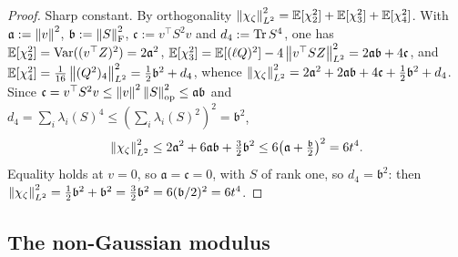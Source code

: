 \begin{proof}
Sharp constant. By orthogonality
$\left\lVert \chi_\zeta\right\rVert_{L^2}^2=\mathbb{E}[\chi_2^2]+\mathbb{E}[\chi_3^2]+\mathbb{E}[\chi_4^2]$. With
$\mathfrak a:=\left\lVert v\right\rVert^2$, $\mathfrak b:=\left\lVert S\right\rVert_{\mathrm{F}}^2$, $\mathfrak c:=v^\top S^2v$ and
$d_4:=\operatorname{Tr} S^4$, one has $\mathbb{E}[\chi_2^2]=\operatorname{Var}((v^\top Z)^2)=2\mathfrak a^2$,
$\mathbb{E}[\chi_3^2]=\mathbb{E}[(\ell Q)^2]-4\left\lVert v^\top SZ\right\rVert_{L^2}^2=2\mathfrak a\mathfrak b+4\mathfrak c$,
and $\mathbb{E}[\chi_4^2]=\tfrac1{16}\left\lVert (Q^2)_4\right\rVert_{L^2}^2=\tfrac12\mathfrak b^2+d_4$, whence
$\left\lVert \chi_\zeta\right\rVert_{L^2}^2=2\mathfrak a^2+2\mathfrak a\mathfrak b+4\mathfrak c+\tfrac12\mathfrak b^2+d_4$.
Since $\mathfrak c=v^\top S^2v\leq\left\lVert v\right\rVert^2\left\lVert S\right\rVert_{\mathrm{op}}^2\leq\mathfrak a\mathfrak b$ and
$d_4=\sum_i\lambda_i(S)^4\leq(\sum_i\lambda_i(S)^2)^2=\mathfrak b^2$,
\[
    \left\lVert \chi_\zeta\right\rVert_{L^2}^2
    \leq2\mathfrak a^2+6\mathfrak a\mathfrak b+\tfrac32\mathfrak b^2
    \leq6\bigl(\mathfrak a+\tfrac{\mathfrak b}2\bigr)^2=6t^4 .
\]
Equality holds at $v=0$, so $\mathfrak a=\mathfrak c=0$, with $S$ of rank one, so
$d_4=\mathfrak b^2$: then
$\left\lVert \chi_\zeta\right\rVert_{L^2}^2=\tfrac12\mathfrak b^2+\mathfrak b^2=\tfrac32\mathfrak b^2=6(\mathfrak b/2)^2=6t^4$.
\end{proof}

\subsection{The non-Gaussian modulus}

